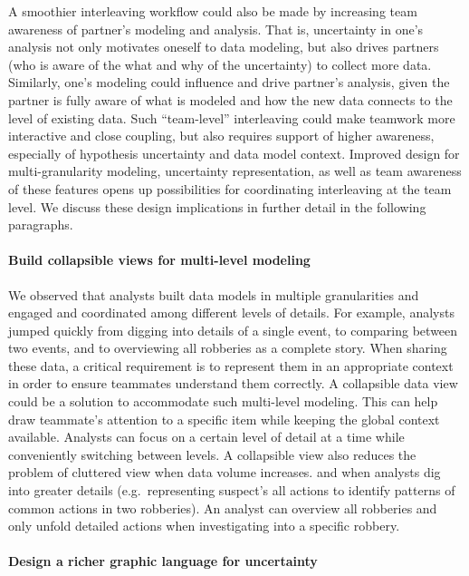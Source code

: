 A smoothier interleaving workflow could also be made by increasing team
awareness of partner's modeling and analysis. That is, uncertainty in one's
analysis not only motivates oneself to data modeling, but also drives partners
(who is aware of the what and why of the uncertainty) to collect more data.
Similarly, one's modeling could influence and drive partner's analysis, given
the partner is fully aware of what is modeled and how the new data connects to
the level of existing data. Such ``team-level'' interleaving could make teamwork
more interactive and close coupling, but also requires support of higher
awareness, especially of hypothesis uncertainty and data model context. Improved
design for multi-granularity modeling, uncertainty representation, as well as
team awareness of these features opens up possibilities for coordinating
interleaving at the team level. We discuss these design implications in further
detail in the following paragraphs.

\paragraph{Build collapsible views for multi-level modeling}

We observed that analysts built data models in multiple granularities and  engaged and coordinated among different levels of details. For example, analysts jumped
quickly from digging into details of a single event, to comparing between two
events, and to overviewing all robberies as a complete story. When sharing these data, a critical requirement is to represent them in an appropriate context in order to ensure teammates understand them correctly. A collapsible data view could be a solution to accommodate such
multi-level modeling. This can help draw teammate's attention to a specific item
while keeping the global context available. Analysts can focus on a certain
level of detail at a time while conveniently switching between levels. A
collapsible view also reduces the problem of cluttered view when data volume
increases.  and when analysts dig into greater
details (e.g.~representing suspect's all actions to identify patterns of common
actions in two robberies). An analyst can overview all robberies and only unfold
detailed actions when investigating into a specific robbery.

\paragraph{Design a richer graphic language for uncertainty}

